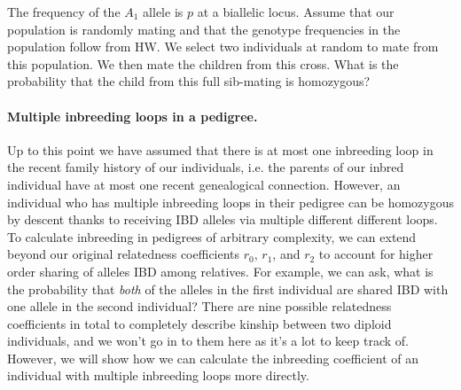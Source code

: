 {{\begin{question}{}
The frequency of the $A_1$ allele is $p$ at a biallelic locus. Assume that our population is randomly mating and that the
genotype frequencies in the population follow from HW. We select two
individuals at random to mate from this population. We then mate the children
from this cross. What is the probability that the child from this full
sib-mating is
homozygous?
\end{question}

\paragraph{Multiple inbreeding loops in a pedigree.}
Up to this point we have assumed that there is at most one inbreeding loop in the recent family history of our
  individuals, i.e. the parents of our inbred individual have at most one recent genealogical connection. However, an individual who has multiple inbreeding loops in their pedigree can be homozygous by
  descent thanks to receiving IBD alleles via multiple different different loops. To calculate inbreeding in pedigrees of arbitrary complexity, we can extend
 beyond our original relatedness coefficients $r_0$, $r_1$, and $r_2$ to account for
 higher order sharing of alleles IBD among relatives. For example,
 we can ask, what is the probability that \textit{both} of the alleles in the first individual
 are shared IBD with one allele in the second individual? There are
 nine possible relatedness coefficients in total to completely describe kinship between two diploid individuals, and we won't go in to them here
 as it's a lot to keep track of.
However, we will show how we can calculate the inbreeding coefficient of an
individual with multiple inbreeding loops more directly.\\


}}

